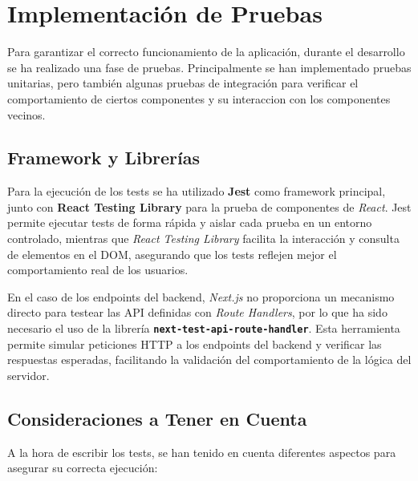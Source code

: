 \section{Implementación de Pruebas}

Para garantizar el correcto funcionamiento de la aplicación, durante el desarrollo se ha realizado una fase de pruebas. Principalmente se han implementado pruebas unitarias, pero también algunas pruebas de integración para verificar el comportamiento de ciertos componentes y su interaccion con los componentes vecinos.

\subsection{Framework y Librerías}

Para la ejecución de los tests se ha utilizado \textbf{Jest} como framework principal, junto con \textbf{React Testing Library} para la prueba de componentes de \textit{React}. Jest permite ejecutar tests de forma rápida y aislar cada prueba en un entorno controlado, mientras que \textit{React Testing Library} facilita la interacción y consulta de elementos en el DOM, asegurando que los tests reflejen mejor el comportamiento real de los usuarios.

En el caso de los endpoints del backend, \textit{Next.js} no proporciona un mecanismo directo para testear las API definidas con \textit{Route Handlers}, por lo que ha sido necesario el uso de la librería \textbf{\texttt{next-test-api-route-handler}}. Esta herramienta permite simular peticiones HTTP a los endpoints del backend y verificar las respuestas esperadas, facilitando la validación del comportamiento de la lógica del servidor.

\subsection{Consideraciones a Tener en Cuenta}

A la hora de escribir los tests, se han tenido en cuenta diferentes aspectos para asegurar su correcta ejecución:

